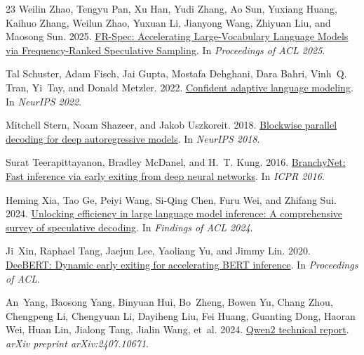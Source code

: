 \documentclass[11pt]{article}
\begin{document}
\begin{thebibliography}{23}
Weilin Zhao, Tengyu Pan, Xu Han, Yudi Zhang, Ao Sun, Yuxiang Huang, Kaihuo Zhang, Weilun Zhao, Yuxuan Li, Jianyong Wang, Zhiyuan Liu, and Maosong Sun. 2025.
\newblock \href{https://arxiv.org/abs/2502.14856}{FR-Spec: Accelerating Large-Vocabulary Language Models via Frequency-Ranked Speculative Sampling}.
\newblock In \emph{Proceedings of ACL 2025}.

Tal Schuster, Adam Fisch, Jai Gupta, Mostafa Dehghani, Dara Bahri, Vinh~Q. Tran, Yi~Tay, and Donald Metzler. 2022.
\newblock \href{https://arxiv.org/abs/2207.07061}{Confident adaptive language modeling}.
\newblock In \emph{NeurIPS 2022}.

Mitchell Stern, Noam Shazeer, and Jakob Uszkoreit. 2018.
\newblock \href{https://arxiv.org/abs/1811.03115}{Blockwise parallel decoding for deep autoregressive models}.
\newblock In \emph{NeurIPS 2018}.

Surat Teerapittayanon, Bradley McDanel, and H.~T. Kung. 2016.
\newblock \href{https://arxiv.org/abs/1709.01686}{BranchyNet: Fast inference via early exiting from deep neural networks}.
\newblock In \emph{ICPR 2016}.

Heming Xia, Tao Ge, Peiyi Wang, Si-Qing Chen, Furu Wei, and Zhifang Sui. 2024.
\newblock \href{https://arxiv.org/abs/2401.07851}{Unlocking efficiency in large language model inference: A comprehensive survey of speculative decoding}.
\newblock In \emph{Findings of ACL 2024}.

Ji~Xin, Raphael Tang, Jaejun Lee, Yaoliang Yu, and Jimmy Lin. 2020.
\newblock \href{https://arxiv.org/abs/2004.12993}{DeeBERT: Dynamic early exiting for accelerating BERT inference}.
\newblock In \emph{Proceedings of ACL}.

An~Yang, Baosong Yang, Binyuan Hui, Bo~Zheng, Bowen Yu, Chang Zhou, Chengpeng Li, Chengyuan Li, Dayiheng Liu, Fei Huang, Guanting Dong, Haoran Wei, Huan Lin, Jialong Tang, Jialin Wang, et~al. 2024.
\newblock \href{https://arxiv.org/abs/2407.10671}{Qwen2 technical report}.
\newblock \emph{arXiv preprint arXiv:2407.10671}.


\end{thebibliography}
\end{document}

